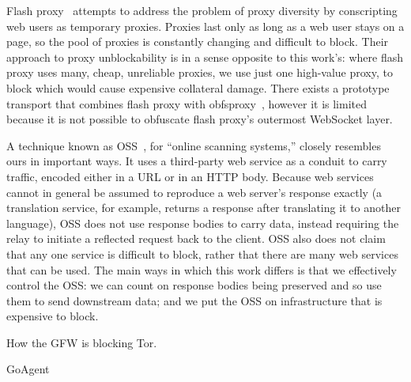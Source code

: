 \documentclass{article}
\begin{document}
Flash proxy~\cite{flashproxy-pets12} attempts to address the problem of proxy diversity
by conscripting web users as temporary proxies.
Proxies last only as long as a web user stays on a page, so the pool of proxies is
constantly changing and difficult to block.
Their approach to proxy unblockability is in a sense opposite to this work's:
where flash proxy uses many, cheap, unreliable proxies,
we use just one high-value proxy, to block which would cause expensive collateral damage.
There exists a prototype transport that combines flash proxy with obfsproxy~\cite{obfs-flash},
however it is limited because it is not possible to obfuscate flash proxy's outermost WebSocket layer.

A technique known as OSS~\cite{oss}, for ``online scanning systems,''
closely resembles ours in important ways.
It uses a third-party web service as a conduit to carry traffic,
encoded either in a URL or in an HTTP body.
Because web services cannot in general be assumed to reproduce a web server's
response exactly
(a translation service, for example, returns a response after translating it to another language),
OSS does not use response bodies to carry data,
instead requiring the relay to initiate a reflected request back to the client.
OSS also does not claim that any one service is difficult to block, rather that there are many web services that can be used.
The main ways in which this work differs is that we effectively control the OSS:
we can count on response bodies being preserved and so use them to send downstream data;
and we put the OSS on infrastructure that is expensive to block.

How the GFW is blocking Tor.
\cite{foci12-winter}

GoAgent




\end{document}
